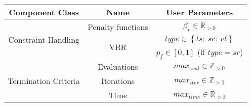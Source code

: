 
\renewcommand{\arraystretch}{1.4}

  \begin{tabular}{|c|c|c|}
    \hline
    \textbf{Component Class} & \textbf{Name} & \textbf{User Parameters} \\
    \hline
\multirow{3}{*}{Constraint Handling}&
	Penalty functions& $\beta_v\in\mathbb{R}_{>0}$ \\
	\cline{2-3}
	& \multirow{2}{*}{VBR}& $type \in \left\{ts;~sr;~vt\right\}$ \\
	& & $p_f\in\left[0,1\right]$ (if $type = sr$) \\
	\hline
\multirow{3}{*}{Termination Criteria}&
	Evaluations& $max_{eval}\in\mathbb{Z}_{>0}$ \\
	\cline{2-3}
	& Iterations& $max_{iter}\in\mathbb{Z}_{>0}$ \\
	\cline{2-3}
	& Time& $max_{time}\in\mathbb{R}_{>0}$ \\
    \hline
    \end{tabular} 
